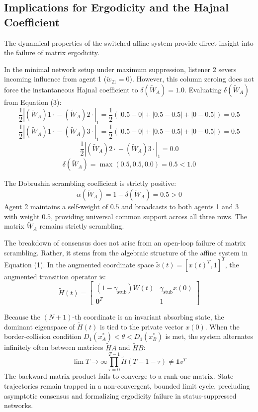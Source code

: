 \subsection{Implications for Ergodicity and the Hajnal Coefficient}
The dynamical properties of the switched affine system provide direct insight into the failure of matrix ergodicity\cite{degroot1974reaching}.

In the minimal network setup under maximum suppression, listener 2 severs incoming influence from agent 1 ($\tilde{w}_{21} = 0$)\cite{degroot1974reaching}. However, this column zeroing does not force the instantaneous Hajnal coefficient to $\delta(\tilde{W}_A) = 1.0$\cite{acemoglu2013opinion}. Evaluating $\delta(\tilde{W}_A)$ from Equation (3)\cite{acemoglu2013opinion}: $$\frac{1}{2} |(\tilde{W}_A){1\cdot} - (\tilde{W}_A){2\cdot}|_1 = \frac{1}{2} (|0.5 - 0| + |0.5 - 0.5| + |0 - 0.5|) = 0.5$$ $$\frac{1}{2} |(\tilde{W}_A){1\cdot} - (\tilde{W}_A){3\cdot}|_1 = \frac{1}{2} (|0.5 - 0| + |0.5 - 0.5| + |0 - 0.5|) = 0.5$$ $$\frac{1}{2} |(\tilde{W}_A){2\cdot} - (\tilde{W}_A){3\cdot}|_1 = 0.0$$ $$\delta(\tilde{W}_A) = \max(0.5, 0.5, 0.0) = 0.5 < 1.0$$

The Dobrushin scrambling coefficient is strictly positive\cite{acemoglu2013opinion}: $$\alpha(\tilde{W}_A) = 1 - \delta(\tilde{W}_A) = 0.5 > 0$$ Agent 2 maintains a self-weight of $0.5$ and broadcasts to both agents 1 and 3 with weight $0.5$, providing universal common support across all three rows\cite{acemoglu2013opinion}. The matrix $\tilde{W}_A$ remains strictly scrambling\cite{acemoglu2013opinion}.

The breakdown of consensus does not arise from an open-loop failure of matrix scrambling\cite{acemoglu2013opinion,hajnal1958weak}. Rather, it stems from the algebraic structure of the affine system in Equation (1)\cite{acemoglu2013opinion,hajnal1958weak}. In the augmented coordinate space $\tilde{x}(t) = [x(t)^T, 1]^T$, the augmented transition operator is\cite{acemoglu2013opinion}: $$\tilde{H}(t) = \begin{bmatrix} (1 - \gamma_{\text{stub}}) \tilde{W}(t) & \gamma_{\text{stub}} x(0) \\ \mathbf{0}^T & 1 \end{bmatrix}$$

Because the $(N+1)$-th coordinate is an invariant absorbing state, the dominant eigenspace of $\tilde{H}(t)$ is tied to the private vector $x(0)$\cite{acemoglu2013opinion}. When the border-collision condition $D_1(x_A^*) < \theta < D_1(x_B^*)$ is met, the system alternates infinitely often between matrices $\tilde{H}A$ and $\tilde{H}B$\cite{degroot1974reaching,acemoglu2013opinion}: $$\lim{T \to \infty} \prod_{\tau=0}^{T-1} \tilde{H}(T - 1 - \tau) \ne \mathbf{1} v^T$$ The backward matrix product fails to converge to a rank-one matrix\cite{degroot1974reaching,acemoglu2013opinion}. State trajectories remain trapped in a non-convergent, bounded limit cycle, precluding asymptotic consensus and formalizing ergodicity failure in status-suppressed networks\cite{degroot1974reaching,acemoglu2013opinion}.

